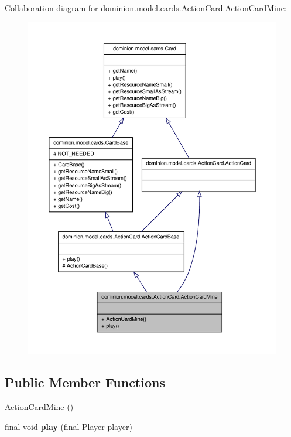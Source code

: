 \-Collaboration diagram for dominion.\-model.\-cards.\-Action\-Card.\-Action\-Card\-Mine\-:
\nopagebreak
\begin{figure}[H]
\begin{center}
\leavevmode
\includegraphics[width=350pt]{classdominion_1_1model_1_1cards_1_1ActionCard_1_1ActionCardMine__coll__graph}
\end{center}
\end{figure}
\subsection*{\-Public \-Member \-Functions}
\begin{DoxyCompactItemize}
\item 
\hyperlink{classdominion_1_1model_1_1cards_1_1ActionCard_1_1ActionCardMine_aaf278632c2462a22b2f1c09a09004533}{\-Action\-Card\-Mine} ()
\item 
\hypertarget{classdominion_1_1model_1_1cards_1_1ActionCard_1_1ActionCardMine_a4788da41737d070bc2aef843a11446d2}{final void {\bfseries play} (final \hyperlink{interfacedominion_1_1model_1_1Player}{\-Player} player)}\label{classdominion_1_1model_1_1cards_1_1ActionCard_1_1ActionCardMine_a4788da41737d070bc2aef843a11446d2}

\end{DoxyCompactItemize}


